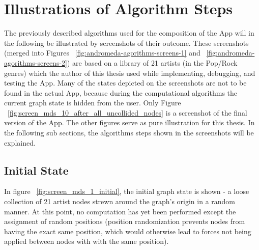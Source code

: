 \section{Illustrations of Algorithm Steps}

The previously described algorithms used for the composition of the App will in the following be illustrated by screenshots of their outcome. These screenshots (merged into Figures ~\ref{fig:andromeda-agorithms-screens-1} and ~\ref{fig:andromeda-agorithms-screens-2}) are based on a library of 21 artists (in the Pop/Rock genres) which the author of this thesis used while implementing, debugging, and testing the App. Many of the states depicted on the screenshots are not to be found in the actual App, because during the computational algorithms the current graph state is hidden from the user. Only Figure ~\ref{fig:screen_mds_10_after_all_uncollided_nodes} is a screenshot of the final version of the App. The other figures serve as pure illustration for this thesis. In the following sub sections, the algorithms steps shown in the screenshots will be explained.

\subsection{Initial State}

In figure ~\ref{fig:screen_mds_1_initial}, the initial graph state is shown - a loose collection of 21 artist nodes strewn around the graph's origin in a random manner. At this point, no computation has yet been performed except the assignment of random positions (position randomization prevents nodes from having the exact same position, which would otherwise lead to forces not being applied between nodes with with the same position).

